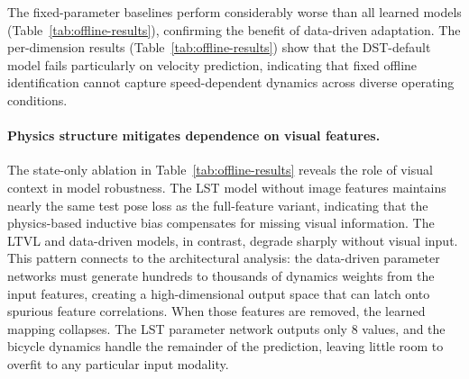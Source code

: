 The fixed-parameter baselines perform considerably worse than all learned models (Table~\ref{tab:offline-results}), confirming the benefit of data-driven adaptation. The per-dimension results (Table~\ref{tab:offline-results}) show that the DST-default model fails particularly on velocity prediction, indicating that fixed offline identification cannot capture speed-dependent dynamics across diverse operating conditions.

\paragraph{Physics structure mitigates dependence on visual features.}
The state-only ablation in Table~\ref{tab:offline-results} reveals the role of visual context in model robustness. The LST model without image features maintains nearly the same test pose loss as the full-feature variant, indicating that the physics-based inductive bias compensates for missing visual information. The LTVL and data-driven models, in contrast, degrade sharply without visual input. This pattern connects to the architectural analysis: the data-driven parameter networks must generate hundreds to thousands of dynamics weights from the input features, creating a high-dimensional output space that can latch onto spurious feature correlations. When those features are removed, the learned mapping collapses. The LST parameter network outputs only 8 values, and the bicycle dynamics handle the remainder of the prediction, leaving little room to overfit to any particular input modality.

